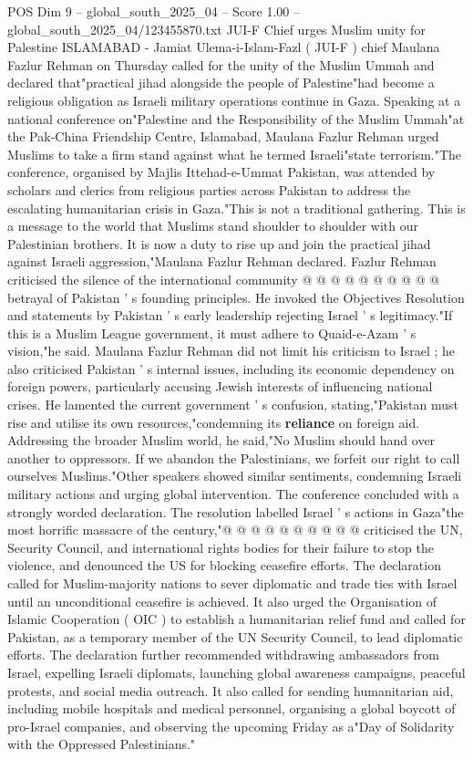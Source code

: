 \begin{textsample}{POS Dim 9 – global\_south\_2025\_04 – Score 1.00 – global\_south\_2025\_04/123455870.txt}  \label{ex:f9_pos_152}
JUI-F Chief urges Muslim unity for Palestine ISLAMABAD - Jamiat Ulema-i-Islam-Fazl ( JUI-F ) chief Maulana Fazlur Rehman on Thursday called for the unity of the Muslim Ummah and declared that"practical jihad alongside the people of Palestine"had become a religious obligation as Israeli military operations continue in Gaza.
Speaking at a national conference on"Palestine and the Responsibility of the Muslim Ummah"at the Pak-China Friendship Centre, Islamabad, Maulana Fazlur Rehman urged Muslims to take a firm stand against what he termed Israeli"state terrorism."The conference, organised by Majlis Ittehad-e-Ummat Pakistan, was attended by scholars and clerics from religious parties across Pakistan to address the escalating humanitarian crisis in Gaza."This is not a traditional gathering.
This is a message to the world that Muslims stand shoulder to shoulder with our Palestinian brothers.
It is now a duty to rise up and join the practical jihad against Israeli aggression,"Maulana Fazlur Rehman declared.
Fazlur Rehman criticised the silence of the international community @ @ @ @ @ @ @ @ @ @ betrayal of Pakistan ' s founding principles.
He invoked the Objectives Resolution and statements by Pakistan ' s early leadership rejecting Israel ' s legitimacy."If this is a Muslim League government, it must adhere to Quaid-e-Azam ' s vision,"he said.
Maulana Fazlur Rehman did not limit his criticism to Israel ; he also criticised Pakistan ' s internal issues, including its economic dependency on foreign powers, particularly accusing Jewish interests of influencing national crises.
He lamented the current government ' s confusion, stating,"Pakistan must rise and utilise its own resources,"condemning its \textbf{reliance} on foreign aid.
Addressing the broader Muslim world, he said,"No Muslim should hand over another to oppressors.
If we abandon the Palestinians, we forfeit our right to call ourselves Muslims."Other speakers showed similar sentiments, condemning Israeli military actions and urging global intervention.
The conference concluded with a strongly worded declaration.
The resolution labelled Israel ' s actions in Gaza"the most horrific massacre of the century,"@ @ @ @ @ @ @ @ @ @ criticised the UN, Security Council, and international rights bodies for their failure to stop the violence, and denounced the US for blocking ceasefire efforts.
The declaration called for Muslim-majority nations to sever diplomatic and trade ties with Israel until an unconditional ceasefire is achieved.
It also urged the Organisation of Islamic Cooperation ( OIC ) to establish a humanitarian relief fund and called for Pakistan, as a temporary member of the UN Security Council, to lead diplomatic efforts.
The declaration further recommended withdrawing ambassadors from Israel, expelling Israeli diplomats, launching global awareness campaigns, peaceful protests, and social media outreach.
It also called for sending humanitarian aid, including mobile hospitals and medical personnel, organising a global boycott of pro-Israel companies, and observing the upcoming Friday as a"Day of Solidarity with the Oppressed Palestinians."

\end{textsample}
